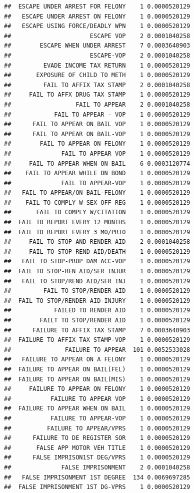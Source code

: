 \documentclass[]{book}
\begin{document}
\begin{verbatim}
##  ESCAPE UNDER ARREST FOR FELONY    1 0.0000520129
##   ESCAPE UNDER ARREST ON FELONY    1 0.0000520129
##   ESCAPE USING FORCE/DEADLY WPN    1 0.0000520129
##                      ESCAPE VOP    2 0.0001040258
##        ESCAPE WHEN UNDER ARREST    7 0.0003640903
##                      ESCAPE-VOP    2 0.0001040258
##         EVADE INCOME TAX RETURN    1 0.0000520129
##       EXPOSURE OF CHILD TO METH    1 0.0000520129
##         FAIL TO AFFIX TAX STAMP    2 0.0001040258
##     FAIL TO AFFX DRUG TAX STAMP    1 0.0000520129
##                  FAIL TO APPEAR    2 0.0001040258
##            FAIL TO APPEAR - VOP    1 0.0000520129
##      FAIL TO APPEAR ON BAIL VOP    1 0.0000520129
##      FAIL TO APPEAR ON BAIL-VOP    1 0.0000520129
##        FAIL TO APPEAR ON FELONY    1 0.0000520129
##              FAIL TO APPEAR VOP    1 0.0000520129
##     FAIL TO APPEAR WHEN ON BAIL    6 0.0003120774
##    FAIL TO APPEAR WHILE ON BOND    1 0.0000520129
##              FAIL TO APPEAR-VOP    1 0.0000520129
##   FAIL TO APPEAR/ON BAIL-FELONY    1 0.0000520129
##    FAIL TO COMPLY W SEX OFF REG    1 0.0000520129
##       FAIL TO COMPLY W/CITATION    1 0.0000520129
##  FAIL TO REPORT EVERY 12 MONTHS    1 0.0000520129
##  FAIL TO REPORT EVERY 3 MO/PRIO    1 0.0000520129
##     FAIL TO STOP AND RENDER AID    2 0.0001040258
##     FAIL TO STOP REND AID/DEATH    1 0.0000520129
##   FAIL TO STOP-PROP DAM ACC-VOP    1 0.0000520129
##  FAIL TO STOP-REN AID/SER INJUR    1 0.0000520129
##   FAIL TO STOP/REND AID/SER INJ    1 0.0000520129
##         FAIL TO STOP/RENDER AID    1 0.0000520129
##  FAIL TO STOP/RENDER AID-INJURY    1 0.0000520129
##            FAILED TO RENDER AID    1 0.0000520129
##        FAILT TO STOP/RENDER AID    1 0.0000520129
##      FAILURE TO AFFIX TAX STAMP    7 0.0003640903
##  FAILURE TO AFFIX TAX STAMP-VOP    1 0.0000520129
##               FAILURE TO APPEAR  101 0.0052533028
##   FAILURE TO APPEAR ON A FELONY    1 0.0000520129
##  FAILURE TO APPEAR ON BAIL(FEL)    1 0.0000520129
##  FAILURE TO APPEAR ON BAIL(MIS)    1 0.0000520129
##     FAILURE TO APPEAR ON FELONY    1 0.0000520129
##           FAILURE TO APPEAR VOP    1 0.0000520129
##  FAILURE TO APPEAR WHEN ON BAIL    1 0.0000520129
##           FAILURE TO APPEAR-VOP    1 0.0000520129
##          FAILURE TO APPEAR/VPRS    1 0.0000520129
##      FAILURE TO DE REGISTER SOR    1 0.0000520129
##       FALSE APP MOTOR VEH TITLE    1 0.0000520129
##      FALSE IMPRISON1ST DEG/VPRS    1 0.0000520129
##              FALSE IMPRISONMENT    2 0.0001040258
##   FALSE IMPRISONMENT 1ST DEGREE  134 0.0069697285
##  FALSE IMPRISONMENT 1ST DG-VPRS    1 0.0000520129

\end{verbatim}
\end{document}
